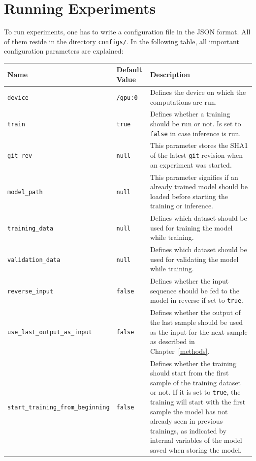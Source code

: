 
\clearpage

\section{Running Experiments}
\label{software_usage:running_experiments}
To run experiments, one has to write a configuration file in the JSON format. All of them reside in the directory \texttt{configs/}. In the following table, all important configuration parameters are explained:

\begin{table}[H]
	\centering
	\begin{adjustbox}{max width=\textwidth, max height=\textheight}
		\begin{tabular}{llp{10cm}}
			\toprule
			Name & Default Value & Description\\ \midrule
			\texttt{device} & \texttt{/gpu:0} & Defines the device on which the computations are run.\\
			\texttt{train} & \texttt{true} & Defines whether a training should be run or not. Is set to \texttt{false} in case inference is run.\\
			\texttt{git\_rev} & \texttt{null} & This parameter stores the SHA1 of the latest \texttt{git} revision when an experiment was started.\\
			\texttt{model\_path} & \texttt{null} & This parameter signifies if an already trained model should be loaded before starting the training or inference.\\
			\texttt{training\_data} & \texttt{null} & Defines which dataset should be used for training the model while training.\\
			\texttt{validation\_data} & \texttt{null} & Defines which dataset should be used for validating the model while training.\\
			\texttt{reverse\_input} & \texttt{false} & Defines whether the input sequence should be fed to the model in reverse if set to \texttt{true}.\\
			\texttt{use\_last\_output\_as\_input} & \texttt{false} & Defines whether the output of the last sample should be used as the input for the next sample as described in Chapter~\ref{methods}.\\
			\texttt{start\_training\_from\_beginning} & \texttt{false} & Defines whether the training should start from the first sample of the training dataset or not. If it is set to \texttt{true}, the training will start with the first sample the model has not already seen in previous trainings, as indicated by internal variables of the model saved when storing the model.\\

\end{tabular}
\end{adjustbox}
\end{table}
